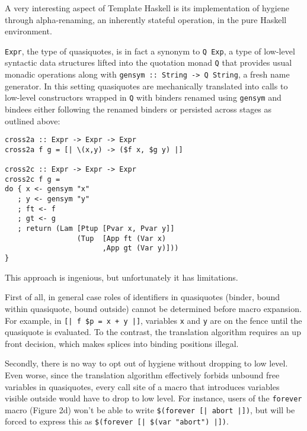 \documentclass[10pt,journal,a4paper]{IEEEtran}
\begin{document}
A very interesting aspect of Template Haskell is its implementation of hygiene through alpha-renaming,
an inherently stateful operation, in the pure Haskell environment.

\small \texttt{Expr}\normalsize,
the type of quasiquotes, is in fact a synonym to \small \texttt{Q Exp}\normalsize,
a type of low-level syntactic data structures lifted into the quotation monad \small \texttt{Q}\normalsize
that provides usual monadic operations along with \small \texttt{gensym :: String -> Q String}\normalsize,
a fresh name generator.
In this setting quasiquotes are mechanically translated into calls to low-level constructors wrapped in
\small \texttt{Q} \normalsize with binders renamed using \small \texttt{gensym} \normalsize and bindees
either following the renamed binders or persisted across stages as outlined above:

\small
\begin{verbatim}
cross2a :: Expr -> Expr -> Expr
cross2a f g = [| \(x,y) -> ($f x, $g y) |]

cross2c :: Expr -> Expr -> Expr
cross2c f g =
do { x <- gensym "x"
   ; y <- gensym "y"
   ; ft <- f
   ; gt <- g
   ; return (Lam [Ptup [Pvar x, Pvar y]]
                 (Tup  [App ft (Var x)
                       ,App gt (Var y)]))
}
\end{verbatim}
\normalsize

This approach is ingenious, but unfortunately it has limitations.

First of all, in general case roles
of identifiers in quasiquotes (binder, bound within quasiquote, bound outside) cannot be determined
before macro expansion. For example, in \small \texttt{[|~f~\$p~=~x~+~y~|]}\normalsize,
variables \small \texttt{x} \normalsize and \small \texttt{y} \normalsize are on the fence
until the quasiquote is evaluated. To the contrast, the translation algorithm requires an up front decision,
which makes splices into binding positions illegal.

Secondly, there is no way to opt out of hygiene without dropping to low level.
Even worse, since the translation algorithm effectively forbids unbound free variables in quasiquotes,
every call site of a macro that introduces variables visible outside would have to drop to low level.
For instance, users of the \small \texttt{forever} \normalsize macro (Figure 2d) won't be able to write
\small \texttt{\$(forever [| abort |])}\normalsize, but will be forced to express this as
\small \texttt{\$(forever [| \$(var "abort") |])}\normalsize.
\end{document}
